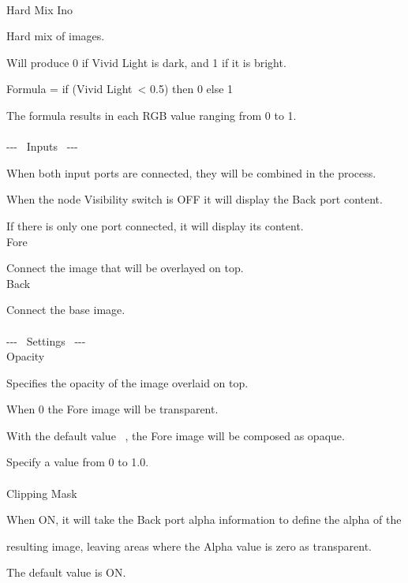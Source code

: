 \documentclass[a4paper,12pt]{article}
\begin{document}
\thispagestyle{empty}

\Large
\noindent \\
Hard Mix Ino\medskip
\par
\normalsize
Hard mix of images.\par
Will produce 0 if Vivid Light is dark, and 1 if it is bright.\par
Formula = if (\textquotedbl Vivid Light\textquotedbl \ < 0.5) then 0 else 1\par
The formula results in each RGB value ranging from 0 to 1.\\
\\
-{-}- \ Inputs \ -{-}-\par
When both input ports are connected, they will be combined in the process.\par
When the node Visibility switch is OFF it will display the Back port content.\par
If there is only one port connected, it will display its content.\\
Fore\par
Connect the image that will be overlayed on top.\\
Back\par
Connect the base image.\\
\\
-{-}- \ Settings \ -{-}-\\
Opacity\par
Specifies the opacity of the image overlaid on top.\par
When 0 the Fore image will be transparent.\par
With the default value \textquotedbl \ , the Fore image will be composed as opaque.\par
Specify a value from 0 to 1.0.\\
\\
Clipping Mask\par
When ON, it will take the Back port alpha information to define the alpha of the\par
resulting image, leaving areas where the Alpha value is zero as transparent.\par
The default value is ON.
\end{document}
